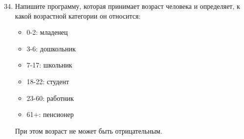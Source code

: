 \documentclass[a4,12pt]{article}
\theoremstyle{remark}
\begin{document}
\begin{enumerate}
    \setcounter{enumi}{33}
    \item Напишите программу, которая принимает возраст человека и определяет, к какой возрастной категории он относится:
    \begin{itemize}
    \item 0-2: младенец
    \item 3-6: дошкольник
    \item 7-17: школьник
    \item 18-22: студент
    \item 23-60: работник
    \item 61+: пенсионер
    \end{itemize}
    
    При этом возраст не может быть отрицательным.
\end{enumerate}
\end{document}
